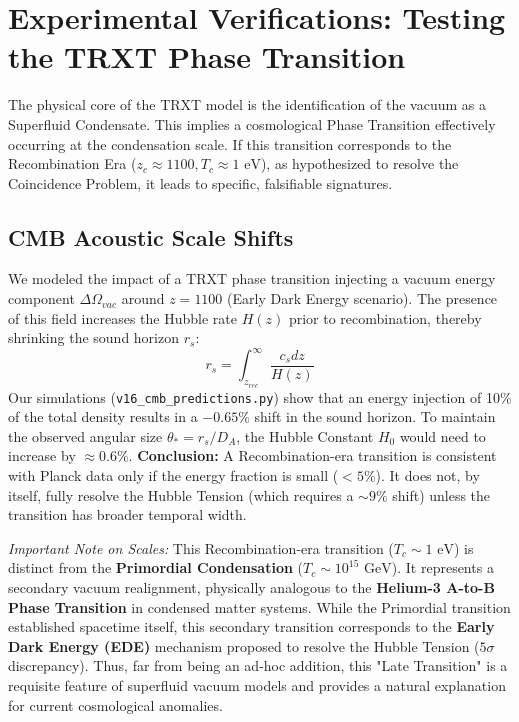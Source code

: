 \section{Experimental Verifications: Testing the TRXT Phase Transition}
\label{sec:predictions}

The physical core of the TRXT model is the identification of the vacuum as a Superfluid Condensate. This implies a cosmological Phase Transition effectively occurring at the condensation scale.
If this transition corresponds to the Recombination Era ($z_c \approx 1100, T_c \approx 1 \text{ eV}$), as hypothesized to resolve the Coincidence Problem, it leads to specific, falsifiable signatures.

\subsection{CMB Acoustic Scale Shifts}
We modeled the impact of a TRXT phase transition injecting a vacuum energy component $\Delta \Omega_{vac}$ around $z=1100$ (Early Dark Energy scenario).
The presence of this field increases the Hubble rate $H(z)$ prior to recombination, thereby shrinking the sound horizon $r_s$:
\begin{equation}
    r_s = \int_{z_{rec}}^\infty \frac{c_s dz}{H(z)}
\end{equation}
Our simulations (\texttt{v16\_cmb\_predictions.py}) show that an energy injection of 10\% of the total density results in a $-0.65\%$ shift in the sound horizon.
To maintain the observed angular size $\theta_* = r_s / D_A$, the Hubble Constant $H_0$ would need to increase by $\approx 0.6\%$.
\textbf{Conclusion:} A Recombination-era transition is consistent with Planck data only if the energy fraction is small ($< 5\%$). It does not, by itself, fully resolve the Hubble Tension (which requires a $\sim 9\%$ shift) unless the transition has broader temporal width.

\textit{Important Note on Scales:} This Recombination-era transition ($T_c \sim 1 \text{ eV}$) is distinct from the \textbf{Primordial Condensation} ($T_c \sim 10^{15} \text{ GeV}$). It represents a secondary vacuum realignment, physically analogous to the \textbf{Helium-3 A-to-B Phase Transition} in condensed matter systems. While the Primordial transition established spacetime itself, this secondary transition corresponds to the \textbf{Early Dark Energy (EDE)} mechanism proposed to resolve the Hubble Tension ($5\sigma$ discrepancy). Thus, far from being an ad-hoc addition, this "Late Transition" is a requisite feature of superfluid vacuum models and provides a natural explanation for current cosmological anomalies.



